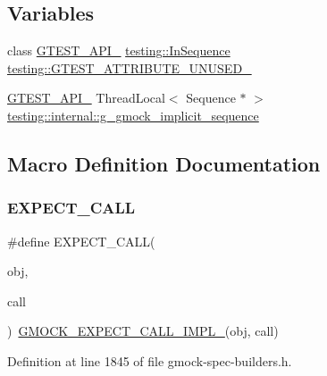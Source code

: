 \subsection*{Variables}
\begin{DoxyCompactItemize}
\item 
class \hyperlink{gtest-port_8h_aa73be6f0ba4a7456180a94904ce17790}{G\+T\+E\+S\+T\+\_\+\+A\+P\+I\+\_\+} \hyperlink{classtesting_1_1InSequence}{testing\+::\+In\+Sequence} \hyperlink{namespacetesting_ae028f80705ba0f84ce7d036bf3793448}{testing\+::\+G\+T\+E\+S\+T\+\_\+\+A\+T\+T\+R\+I\+B\+U\+T\+E\+\_\+\+U\+N\+U\+S\+E\+D\+\_\+}
\item 
\hyperlink{gtest-port_8h_aa73be6f0ba4a7456180a94904ce17790}{G\+T\+E\+S\+T\+\_\+\+A\+P\+I\+\_\+} Thread\+Local$<$ Sequence $\ast$ $>$ \hyperlink{namespacetesting_1_1internal_af4407fe8aeb1e43b2f58940736a20590}{testing\+::internal\+::g\+\_\+gmock\+\_\+implicit\+\_\+sequence}
\end{DoxyCompactItemize}


\subsection{Macro Definition Documentation}
\mbox{\label{gmock-spec-builders_8h_a535a6156de72c1a2e25a127e38ee5232}} 
\subsubsection{\texorpdfstring{E\+X\+P\+E\+C\+T\+\_\+\+C\+A\+LL}{EXPECT\_CALL}}
{\footnotesize\ttfamily \#define E\+X\+P\+E\+C\+T\+\_\+\+C\+A\+LL(\begin{DoxyParamCaption}\item[{}]{obj,  }\item[{}]{call }\end{DoxyParamCaption})~\hyperlink{gmock-spec-builders_8h_ae261d723ebfab24d5831030d320f526c}{G\+M\+O\+C\+K\+\_\+\+E\+X\+P\+E\+C\+T\+\_\+\+C\+A\+L\+L\+\_\+\+I\+M\+P\+L\+\_\+}(obj, call)}



Definition at line 1845 of file gmock-\/spec-\/builders.\+h.

\mbox{\label{gmock-spec-builders_8h_ae261d723ebfab24d5831030d320f526c}} 
